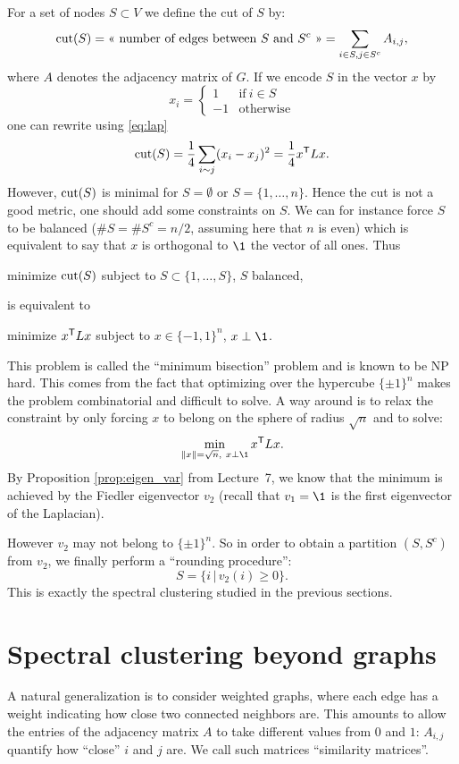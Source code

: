 \documentclass[11pt,nocut]{article}
\begin{document}
For a set of nodes $S \subset V$ we define the cut of $S$ by:
$$
{\rm cut}(S) = \text{<< number of edges between $S$ and $S^c$ >>}
= \sum_{i\in S, j \in S^c} A_{i,j},
$$
where $A$ denotes the adjacency matrix of $G$. If we encode $S$ in the vector $x$ by
$$
x_i =
\begin{cases}
	1 & \text{if} \ i \in S \\
	-1 & \text{otherwise}
\end{cases}
$$
one can rewrite using \eqref{eq:lap}
$$
{\rm cut}(S) = \frac{1}{4} \sum_{i \sim j} (x_i-x_j)^2
=\frac{1}{4} x^{{\sf T}} L x.
$$
However, ${\rm cut}(S)$ is minimal for $S = \emptyset$ or $S = \{1, \dots, n\}$. Hence the cut is not a good metric, one should add some constraints on $S$.
We can for instance force $S$ to be balanced ($\# S = \# S^c = n/2$, assuming here that $n$ is even) which is equivalent to say that $x$ is orthogonal to $\1$ the vector of all ones. Thus
\begin{center}
	minimize ${\rm cut}(S)$ subject to $S \subset \{1, \dots, S\}$, $S$ balanced,
\end{center}
is equivalent to
\begin{center}
	minimize $x^{{\sf T}} L x$ subject to $x \in \{-1,1\}^n$, $x \perp \1$.
\end{center}
This problem is called the ``minimum bisection'' problem and is known to be NP hard. This comes from the fact that optimizing over the hypercube $\{\pm 1\}^n$ makes the problem combinatorial and difficult to solve. A way around is to relax the constraint by only forcing $x$ to belong on the sphere of radius $\sqrt{n}$ and to solve:
$$
\min_{\|x\| = \sqrt{n}, \ x \perp \1} x^{\sT} L x.
$$
By Proposition \ref{prop:eigen_var} from Lecture~7, we know that the minimum is achieved by the Fiedler eigenvector $v_2$ (recall that $v_1 = \1$ is the first eigenvector of the Laplacian).

However $v_2$ may not belong to $\{\pm 1\}^n$. So in order to obtain a partition $(S,S^c)$ from $v_2$, we finally perform a ``rounding procedure'':
$$
S = \{ i \, | \, v_2(i) \geq 0\}.
$$
This is exactly the spectral clustering studied in the previous sections.

\section{Spectral clustering beyond graphs}

A natural generalization is to consider weighted graphs, where each edge has a weight indicating how close two connected neighbors are.
This amounts to allow the entries of the adjacency matrix $A$ to take different values from $0$ and $1$: $A_{i,j}$ quantify how ``close'' $i$ and $j$ are.
We call such matrices ``similarity matrices''.
\end{document}
